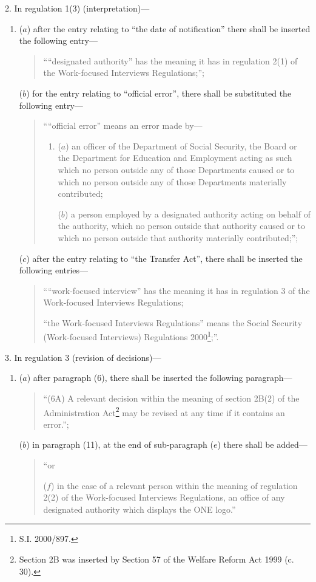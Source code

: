 \documentclass[12pt,a4paper]{article}
\begin{document}
2.  In regulation 1(3) (interpretation)—
\begin{enumerate}\item[]
($a$) after the entry relating to “the date of notification” there shall be inserted the following entry—
\begin{quotation}
    ““designated authority” has the meaning it has in regulation 2(1) of the Work-focused Interviews Regulations;”; 
\end{quotation}

($b$) for the entry relating to “official error”, there shall be substituted the following entry—
\begin{quotation}
    ““official error” means an error made by—
\begin{enumerate}\item[]
    ($a$) 
    an officer of the Department of Social Security, the Board or the Department for Education and Employment acting as such which no person outside any of those Departments caused or to which no person outside any of those Departments materially contributed;

    ($b$) 
    a person employed by a designated authority acting on behalf of the authority, which no person outside that authority caused or to which no person outside that authority materially contributed;”; 
\end{enumerate}
\end{quotation}

($c$) after the entry relating to “the Transfer Act”, there shall be inserted the following entries—
\begin{quotation}
    ““work-focused interview” has the meaning it has in regulation 3 of the Work-focused Interviews Regulations;

    “the Work-focused Interviews Regulations” means the Social Security (Work-focused Interviews) Regulations 2000\footnote{\frenchspacing S.I. 2000/897.};”. 
\end{quotation}
\end{enumerate}

\medskip

3.  In regulation 3 (revision of decisions)—
\begin{enumerate}\item[]
($a$) after paragraph (6), there shall be inserted the following paragraph—
\begin{quotation}
“(6A) A relevant decision within the meaning of section 2B(2) of the Administration Act\footnote{\frenchspacing Section 2B was inserted by Section 57 of the Welfare Reform Act 1999 (c. 30).} may be revised at any time if it contains an error.”;
\end{quotation}

($b$) in paragraph (11), at the end of sub-paragraph ($e$)  there shall be added—
\begin{quotation}
“or

($f$) in the case of a relevant person within the meaning of regulation 2(2) of the Work-focused Interviews Regulations, an office of any designated authority which displays the ONE logo.”
\end{quotation}
\end{enumerate}
\end{document}
